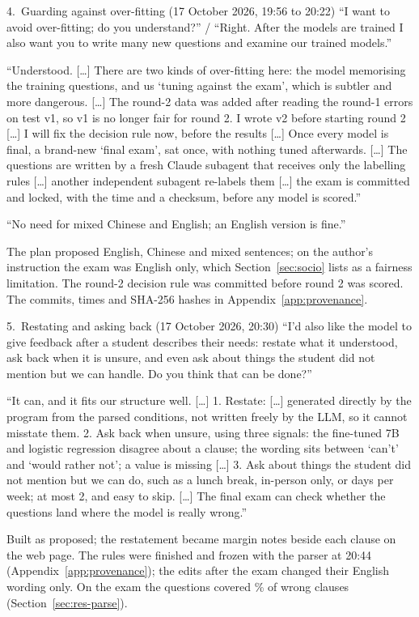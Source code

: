 \begin{exchange}{4.\ Guarding against over-fitting (17 October 2026, 19:56 to 20:22)}
 ``I want to avoid over-fitting; do you understand?'' / ``Right. After the models are trained I also want you to write many new questions and examine our trained models.''

 ``Understood. [\ldots] There are two kinds of over-fitting here: the model memorising the training questions, and us `tuning against the exam', which is subtler and more dangerous. [\ldots] The round-2 data was added after reading the round-1 errors on test v1, so v1 is no longer fair for round 2. I wrote v2 before starting round 2 [\ldots] I will fix the decision rule now, before the results [\ldots] Once every model is final, a brand-new `final exam', sat once, with nothing tuned afterwards. [\ldots] The questions are written by a fresh Claude subagent that receives only the labelling rules [\ldots] another independent subagent re-labels them [\ldots] the exam is committed and locked, with the time and a checksum, before any model is scored.''

 ``No need for mixed Chinese and English; an English version is fine.''

 The plan proposed English, Chinese and mixed sentences; on the author's instruction the exam was English only, which Section~\ref{sec:socio} lists as a fairness limitation. The round-2 decision rule was committed before round 2 was scored.
 The commits, times and SHA-256 hashes in Appendix~\ref{app:provenance}.
\end{exchange}

\begin{exchange}{5.\ Restating and asking back (17 October 2026, 20:30)}
 ``I'd also like the model to give feedback after a student describes their needs: restate what it understood, ask back when it is unsure, and even ask about things the student did not mention but we can handle. Do you think that can be done?''

 ``It can, and it fits our structure well. [\ldots] 1. Restate: [\ldots] generated directly by the program from the parsed conditions, not written freely by the LLM, so it cannot misstate them. 2. Ask back when unsure, using three signals: the fine-tuned 7B and logistic regression disagree about a clause; the wording sits between `can't' and `would rather not'; a value is missing [\ldots] 3. Ask about things the student did not mention but we can do, such as a lunch break, in-person only, or days per week; at most 2, and easy to skip. [\ldots] The final exam can check whether the questions land where the model is really wrong.''

 Built as proposed; the restatement became margin notes beside each clause on the web page. The rules were finished and frozen with the parser at 20:44 (Appendix~\ref{app:provenance}); the edits after the exam changed their English wording only.
 On the exam the questions covered \cCoveredPct\% of wrong clauses (Section~\ref{sec:res-parse}).
\end{exchange}

